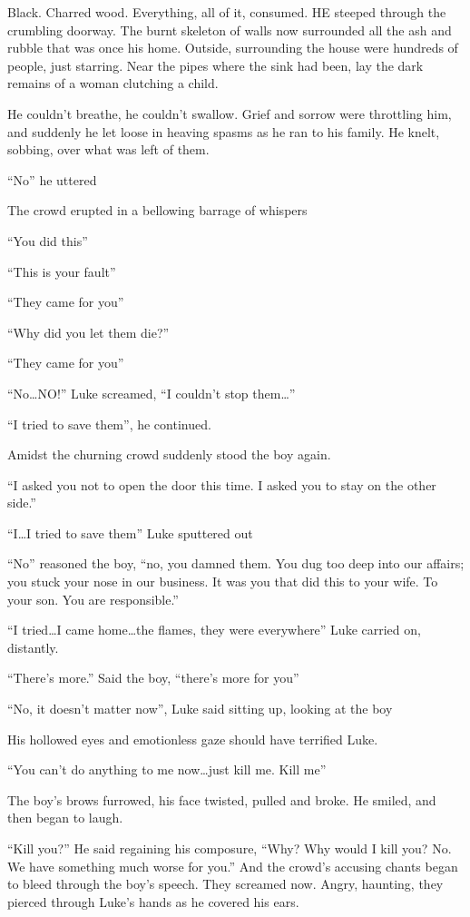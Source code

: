 Black. Charred wood. Everything, all of it, consumed. HE steeped
through the crumbling doorway. The burnt skeleton of walls now
surrounded all the ash and rubble that was once his home. Outside,
surrounding the house were hundreds of people, just starring. Near
the pipes where the sink had been, lay the dark remains of a woman
clutching a child.

He couldn't breathe, he couldn't swallow. Grief and
sorrow were throttling him, and suddenly he let loose in heaving
spasms as he ran to his family. He knelt, sobbing, over what was
left of them.

``No'' he uttered

The crowd erupted in a bellowing barrage of whispers

``You did this''

``This is your fault''

``They came for you''

``Why did you let them die?''

``They came for you''

``No{\ldots}NO!'' Luke screamed, ``I couldn't
stop them{\ldots}''

``I tried to save them'', he continued.

Amidst the churning crowd suddenly stood the boy again.

``I asked you not to open the door this time. I asked you to
stay on the other side.''

``I{\ldots}I tried to save them'' Luke sputtered
out

``No'' reasoned the boy, ``no, you damned them. You
dug too deep into our affairs; you stuck your nose in our business.
It was you that did this to your wife. To your son. You are
responsible.''

``I tried{\ldots}I came home{\ldots}the flames, they were
everywhere'' Luke carried on, distantly.

``There's more.'' Said the boy,
``there's more for you''

``No, it doesn't matter now'', Luke said sitting
up, looking at the boy

His hollowed eyes and emotionless gaze should have terrified
Luke.

``You can't do anything to me now{\ldots}just kill me.
Kill me''

The boy's brows furrowed, his face twisted, pulled and broke.
He smiled, and then began to laugh.

``Kill you?'' He said regaining his composure,
``Why? Why would I kill you? No. We have something much worse
for you.'' And the crowd's accusing chants began to
bleed through the boy's speech. They screamed now. Angry,
haunting, they pierced through Luke's hands as he covered his
ears.

